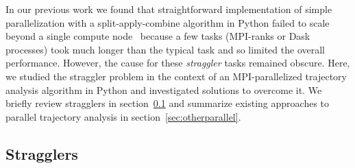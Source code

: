 \label{sec:background}

In our previous work we found that straightforward implementation of simple parallelization with a split-apply-combine algorithm in Python failed to scale beyond a single compute node~\cite{Khoshlessan:2017ab} because a few tasks (MPI-ranks or Dask~\citep{Rocklin:2015aa} processes) took much longer than the typical task and so limited the overall performance.
However, the cause for these \emph{straggler} tasks remained obscure.
Here, we studied the straggler problem in the context of an MPI-parallelized trajectory analysis algorithm in Python and investigated solutions to overcome it.
We briefly review stragglers in section~\ref{sec:stragglers} and summarize existing approaches to parallel trajectory analysis in section~\ref{sec:otherparallel}.

\subsection{Stragglers}
\label{sec:stragglers}


